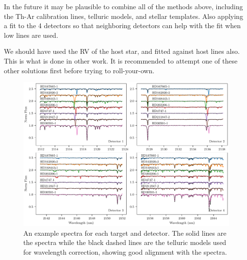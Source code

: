 
In the future it may be plausible to combine all of the methods above, including the Th-Ar calibration lines, telluric models, and stellar templates. Also applying a fit to the 4 detectors so that neighboring detectors can help with the fit when low lines are used.

We should have used the RV of the host star, and fitted against host lines also. This is what is done in other work. It is recommended to attempt one of these other solutions first before trying to roll-your-own. 

\begin{figure}
    \centering
    \includegraphics[width=1\linewidth]{figures/reduction/Spectra_examples}
    \caption{An example spectra for each target and detector. The solid lines are the spectra while the black dashed lines are the telluric models used for wavelength correction, showing good alignment with the spectra.}
    \label{fig:spectraexamples}
\end{figure}


